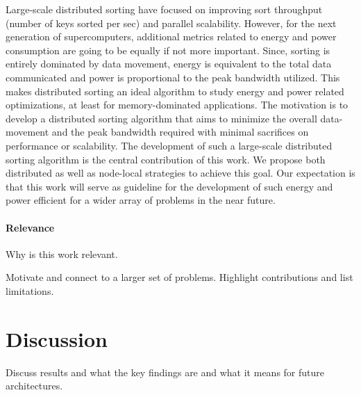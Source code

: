 \documentclass[10pt, conference, compsocconf]{IEEEtran}
\begin{document}
Large-scale distributed sorting have focused on improving sort throughput (number of keys sorted per sec) and parallel scalability. However, for the next generation of supercomputers, additional metrics related to energy and power consumption are going to be equally if not more important. Since, sorting is entirely dominated by data movement, energy is equivalent to the total data communicated and power is proportional to the peak bandwidth utilized. This makes distributed sorting an ideal algorithm to study energy and power related optimizations, at least for memory-dominated applications. The motivation is to develop a distributed sorting algorithm that aims to minimize the overall data-movement and the peak bandwidth required with minimal sacrifices on performance or scalability. The development of such a large-scale distributed sorting algorithm is the central contribution of this work. We propose both distributed as well as node-local strategies to achieve this goal. Our expectation is that this work will serve as guideline for the development of such energy and power efficient for a wider array of problems in the near future.

\paragraph{Relevance} Why is this work relevant. 
 
Motivate and connect to a larger set of problems. Highlight contributions and list limitations.







\section{Discussion}
Discuss results and what the key findings are and what it means for future architectures.





%

 

\end{document}
